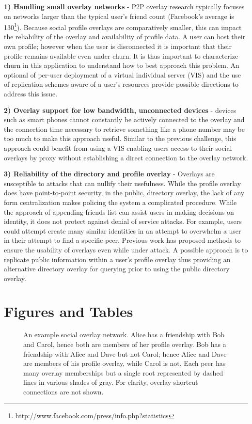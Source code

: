 {\bf 1) Handling small overlay networks} - P2P overlay research typically focuses on
networks larger than the typical user's friend count (Facebook's average is
130\footnote{http://www.facebook.com/press/info.php?statistics}).  Because social profile overlays are comparatively smaller, this can
impact the reliability of the overlay and availability of profile data.  A user
can host their own profile; however when the user is disconnected it is important
that their profile remains available even under churn. It is thus important to
characterize churn in this application to understand how to best approach this
problem. An optional of per-user deployment of a virtual individual server (VIS)
and the use of replication schemes aware of a user's resources provide possible
directions to address this issue.

{\bf 2) Overlay support for low bandwidth, unconnected devices} - devices such as
smart phones cannot constantly be actively connected to the overlay and the
connection time necessary to retrieve something like a phone number may be
too much to make this approach useful.  Similar to the previous challenge,
this approach could benefit from using a VIS enabling users access to their
social overlays by proxy without establishing a direct connection to the overlay
network.

{\bf 3) Reliability of the directory and profile overlay} - Overlays are
susceptible to attacks that can nullify their usefulness.  While
the profile overlay does have point-to-point security, in the public,
directory overlay, the lack of any form centralization makes policing the system
a complicated procedure.  While the approach of appending friends list can assist
users in making decisions on identity, it does not protect against denial of
service attacks.  For example, users could attempt create many similar identities
in an attempt to overwhelm a user in their attempt to find a specific peer.
Previous work has proposed methods to ensure the usability of overlays even
while under attack.  A possible approach is to replicate public information
within a user's profile overlay thus providing an alternative directory overlay
for querying prior to using the public directory overlay.

\section{Figures and Tables}

\begin{figure}[ht]
\centering
{}
\caption{An example social overlay network.  Alice has a friendship with Bob and
Carol, hence both are members of her profile overlay. Bob has a
friendship with Alice and Dave but not Carol; hence Alice and Dave are members of
his profile overlay, while Carol is not.  Each peer has many overlay memberships
but a single root represented by dashed lines in various shades of gray.
For clarity, overlay shortcut connections are not shown.}
\label{fig:system}
\end{figure}

